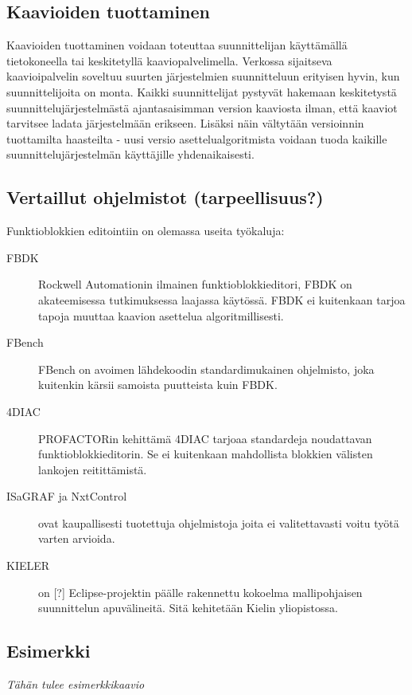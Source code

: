 \documentclass[finnish,12pt]{article}
\begin{document}
		\subsection{Kaavioiden tuottaminen}

Kaavioiden tuottaminen voidaan toteuttaa suunnittelijan käyttämällä tietokoneella tai keskitetyllä kaaviopalvelimella.
Verkossa sijaitseva kaavioipalvelin soveltuu suurten järjestelmien suunnitteluun erityisen hyvin, kun suunnittelijoita on monta. Kaikki suunnittelijat pystyvät hakemaan keskitetystä suunnittelujärjestelmästä ajantasaisimman version kaaviosta ilman, että kaaviot tarvitsee ladata järjestelmään erikseen.
Lisäksi näin vältytään versioinnin tuottamilta haasteilta - uusi versio asettelualgoritmista voidaan tuoda kaikille suunnittelujärjestelmän käyttäjille yhdenaikaisesti.

		\subsection{Vertaillut ohjelmistot (tarpeellisuus?) }

Funktioblokkien editointiin on olemassa useita työkaluja:

\begin{description}
	\item[FBDK] Rockwell Automationin ilmainen funktioblokkieditori, FBDK on akateemisessa tutkimuksessa laajassa käytössä. FBDK ei kuitenkaan tarjoa tapoja muuttaa kaavion asettelua algoritmillisesti.
	\item[FBench] FBench on avoimen lähdekoodin standardimukainen ohjelmisto, joka kuitenkin kärsii samoista puutteista kuin FBDK.
	\item[4DIAC] PROFACTORin kehittämä 4DIAC tarjoaa standardeja noudattavan funktioblokkieditorin. Se ei kuitenkaan mahdollista blokkien välisten lankojen reitittämistä. 
	\item[ISaGRAF ja NxtControl] ovat kaupallisesti tuotettuja ohjelmistoja joita ei valitettavasti voitu työtä varten arvioida.
	\item[KIELER] on [?] Eclipse-projektin päälle rakennettu kokoelma mallipohjaisen suunnittelun apuvälineitä. Sitä kehitetään Kielin yliopistossa.
\end{description}

		\subsection{Esimerkki}
			\emph{Tähän tulee esimerkkikaavio}
\end{document}
